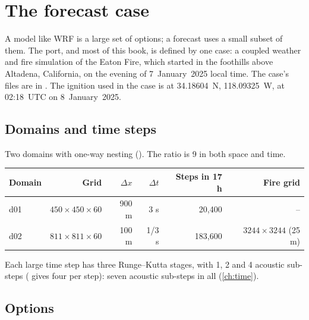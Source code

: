 \chapter{The forecast case}\label{ch:case}

A model like WRF is a large set of options; a forecast uses a small subset of them. The port, and most of this book,
is defined by one case: a coupled weather and fire simulation of the Eaton Fire, which started in the foothills above Altadena,
California, on the evening of 7~January~2025 local time. The case's files are in . The ignition used
in the case is at 34.18604~N, 118.09325~W, at 02:18~UTC on 8~January~2025.

\section{Domains and time steps}

Two domains with one-way nesting (). The ratio is 9 in both space and time.

\begin{center}
\begin{tabular}{lrrrrr}
\toprule
Domain & Grid & $\Delta x$ & $\Delta t$ & Steps in 17 h & Fire grid \\
\midrule
d01 & $450\times450\times60$ & 900 m & 3 s & 20{,}400 & -- \\
d02 & $811\times811\times60$ & 100 m & 1/3 s & 183{,}600 & $3244\times3244$ (25 m) \\
\bottomrule
\end{tabular}
\end{center}

Each large time step has three Runge--Kutta stages, with 1, 2 and 4 acoustic sub-steps
( gives four per step): seven acoustic sub-steps in all (\cref{ch:time}).

\section{Options}

